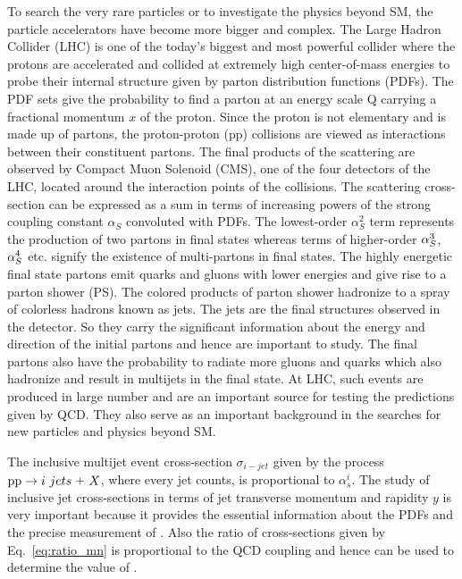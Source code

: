 To search the very rare particles or to investigate the physics beyond SM, the particle accelerators have become more bigger and complex. The Large Hadron Collider (LHC) is one of the today's biggest and most powerful collider where the protons are accelerated and collided at extremely high center-of-mass energies to probe their internal structure given by parton distribution functions (PDFs). The PDF sets give the probability to find a parton at an energy scale Q carrying a fractional momentum $x$ of the proton. Since the proton is not elementary and is made up of partons, the proton-proton (pp) collisions are viewed as interactions between their constituent partons. The final products of the scattering are observed by Compact Muon Solenoid (CMS), one of the four detectors of the LHC, located around the interaction points of the collisions. The scattering cross-section can be expressed as a sum in terms of increasing powers of the strong coupling constant $\alpha_{S}$ convoluted with PDFs. The lowest-order $\alpha_{S}^{2}$ term represents the production of two partons in final states whereas terms of higher-order $\alpha_S^3$, $\alpha_S^4$ etc. signify the existence of multi-partons in final states. The highly energetic final state partons emit quarks and gluons with lower energies and give rise to a parton shower (PS). The colored products of parton shower hadronize to a spray of colorless hadrons known as jets. The jets are the final structures observed in the detector. So they carry the significant information about the energy and direction of the initial partons and hence are important to study. The final partons also have the probability to radiate more gluons and quarks which also hadronize and result in multijets in the final state. At LHC, such events are produced in large number and are an important source for testing the predictions given by QCD. They also serve as an important background in the searches for new particles and physics beyond SM. 

The inclusive multijet event cross-section $\sigma_{i-jet}$ given by the process ${{\rm pp}\to i~jets~\plus X}$, where every jet counts, is proportional to $\alpha^{i}_{s}$. The study of inclusive jet cross-sections in terms of jet transverse momentum \pt and rapidity $y$ is very important because it provides the essential information about the PDFs and the precise measurement of \alps. Also the ratio of cross-sections given by Eq.~\ref{eq:ratio_mn} is proportional to the QCD coupling \alps and hence can be used to determine the value of \alps. 

